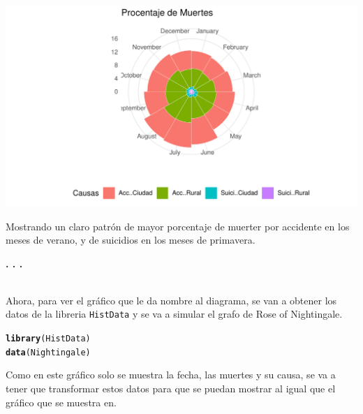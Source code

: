 \documentclass{article}\usepackage[]{graphicx}\usepackage[]{color}
\makeatletter
\def\maxwidth{ %
  \ifdim\Gin@nat@width>\linewidth
    \linewidth
  \else
    \Gin@nat@width
  \fi
}
\newcommand{\hlstd}[1]{\textcolor[rgb]{0.345,0.345,0.345}{#1}}%
\newcommand{\hlkwd}[1]{\textcolor[rgb]{0.737,0.353,0.396}{\textbf{#1}}}%
\newenvironment{kframe}{%
 \def\at@end@of@kframe{}%
 \ifinner\ifhmode%
  \def\at@end@of@kframe{\end{minipage}}%
  \begin{minipage}{\columnwidth}%
 \fi\fi%
 \def\FrameCommand##1{\hskip\@totalleftmargin \hskip-\fboxsep
 \colorbox{shadecolor}{##1}\hskip-\fboxsep
     \hskip-\linewidth \hskip-\@totalleftmargin \hskip\columnwidth}%
 \MakeFramed {\advance\hsize-\width
   \@totalleftmargin\z@ \linewidth\hsize
   \@setminipage}}%
 {\par\unskip\endMakeFramed%
 \at@end@of@kframe}
\newenvironment{knitrout}{}{} %
\makeatother
\begin{document}
\begin{knitrout}
\color{fgcolor}

{\centering \includegraphics[width=\maxwidth]{figure/plot_rose_1-1} 

}



\end{knitrout}
Mostrando un claro patr\'on de mayor porcentaje de muerter por accidente en los meses de verano, y de suicidios en los meses de primavera.
\begin{center}
\textbf{. . .}
\end{center}
~\\
Ahora, para ver el gr\'afico que le da nombre al diagrama, se van a obtener los datos de la libreria \texttt{HistData} y se va a simular el grafo de Rose of Nightingale.
\begin{knitrout}
\color{fgcolor}\begin{kframe}
\begin{alltt}
\hlkwd{library}\hlstd{(HistData)}
\hlkwd{data}\hlstd{(Nightingale)}
\end{alltt}
\end{kframe}
\end{knitrout}
Como en este gr\'afico solo se muestra la fecha, las muertes y su causa, se va a tener que transformar estos datos para que se puedan mostrar al igual que el gr\'afico que se muestra en\cite[p\'ag 113]{Circle}.
\end{document}
